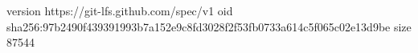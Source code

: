 version https://git-lfs.github.com/spec/v1
oid sha256:97b2490f439391993b7a152e9c8fd3028f2f53fb0733a614c5f065c02e13d9be
size 87544
